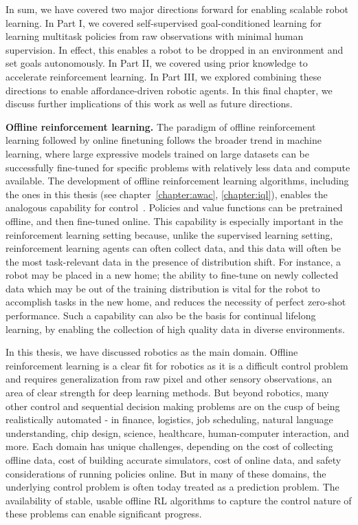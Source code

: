 In sum, we have covered two major directions forward for enabling scalable robot learning.
In Part I, we covered self-supervised goal-conditioned learning for learning multitask policies from raw observations with minimal human supervision.
In effect, this enables a robot to be dropped in an environment and set goals autonomously.
In Part II, we covered using prior knowledge to accelerate reinforcement learning.
In Part III, we explored combining these directions to enable affordance-driven robotic agents.
In this final chapter, we discuss further implications of this work as well as future directions.

\vspace{5mm}

\textbf{Offline reinforcement learning.}
The paradigm of offline reinforcement learning followed by online finetuning follows the broader trend in machine learning, where large expressive models trained on large datasets can be successfully fine-tuned for specific problems with relatively less data and compute available.
The development of offline reinforcement learning algorithms, including the ones in this thesis (see chapter~\ref{chapter:awac}, \ref{chapter:iql}), enables the analogous capability for control~\citep{levine2020offlinetutorial}.
Policies and value functions can be pretrained offline, and then fine-tuned online.
This capability is especially important in the reinforcement learning setting because, unlike the supervised learning setting, reinforcement learning agents can often collect data, and this data will often be the most task-relevant data in the presence of distribution shift.
For instance, a robot may be placed in a new home; the ability to fine-tune on newly collected data which may be out of the training distribution is vital for the robot to accomplish tasks in the new home, and reduces the necessity of perfect zero-shot performance.
Such a capability can also be the basis for continual lifelong learning, by enabling the collection of high quality data in diverse environments.

In this thesis, we have discussed robotics as the main domain.
Offline reinforcement learning is a clear fit for robotics as it is a difficult control problem and requires generalization from raw pixel and other sensory observations, an area of clear strength for deep learning methods.
But beyond robotics, many other control and sequential decision making problems are on the cusp of being realistically automated - in finance, logistics, job scheduling, natural language understanding, chip design, science, healthcare, human-computer interaction, and more.
Each domain has unique challenges, depending on the cost of collecting offline data, cost of building accurate simulators, cost of online data, and safety considerations of running policies online.
But in many of these domains, the underlying control problem is often today treated as a prediction problem.
The availability of stable, usable offline RL algorithms to capture the control nature of these problems can enable significant progress.

